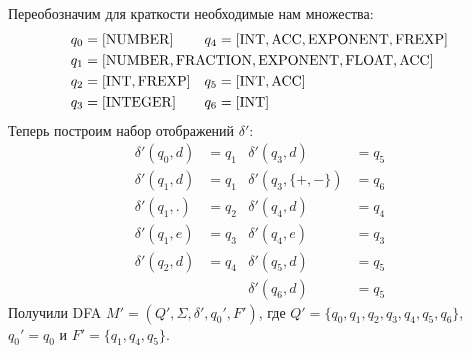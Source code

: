 \documentclass[12pt, oneside]{memoir}
\begin{document}
\begin{solution}
    Переобозначим для краткости необходимые нам множества:
    \begin{align*}
        q_0 & = [\mathrm{NUMBER}]                                                                                 & q_4 & = [\mathrm{INT}, \mathrm{ACC}, \mathrm{EXPONENT}, \mathrm{FREXP}] \\
        q_1 & = \mathrlap{[\mathrm{NUMBER}, \mathrm{FRACTION}, \mathrm{EXPONENT}, \mathrm{FLOAT},  \mathrm{ACC}]}                                                                           \\
        q_2 & = [\mathrm{INT, FREXP}]                                                                             & q_5 & = [\mathrm{INT}, \mathrm{ACC}]                                    \\
        q_3 & = [\mathrm{INTEGER}]                                                                                & q_6 & = [\mathrm{INT}]
    \end{align*}
    Теперь построим набор отображений $\delta'$:
    \begin{align*}
        \delta'(q_0, d) & = q_1 & \delta'(q_3, d)        & = q_5 \\
        \delta'(q_1, d) & = q_1 & \delta'(q_3, \{+, -\}) & = q_6 \\
        \delta'(q_1, .) & = q_2 & \delta'(q_4, d)        & = q_4 \\
        \delta'(q_1, e) & = q_3 & \delta'(q_4, e)        & = q_3 \\
        \delta'(q_2, d) & = q_4 & \delta'(q_5, d)        & = q_5 \\
                        &       & \delta'(q_6, d)        & = q_5
    \end{align*}
    Получили DFA $M' = (Q', \Sigma, \delta', q_0', F')$, где $Q' = \{q_0, q_1, q_2, q_3, q_4, q_5, q_6\}$, $q_0' = q_0$ и $F' = \{q_1, q_4, q_5\}$.
\end{solution}
\end{document}
